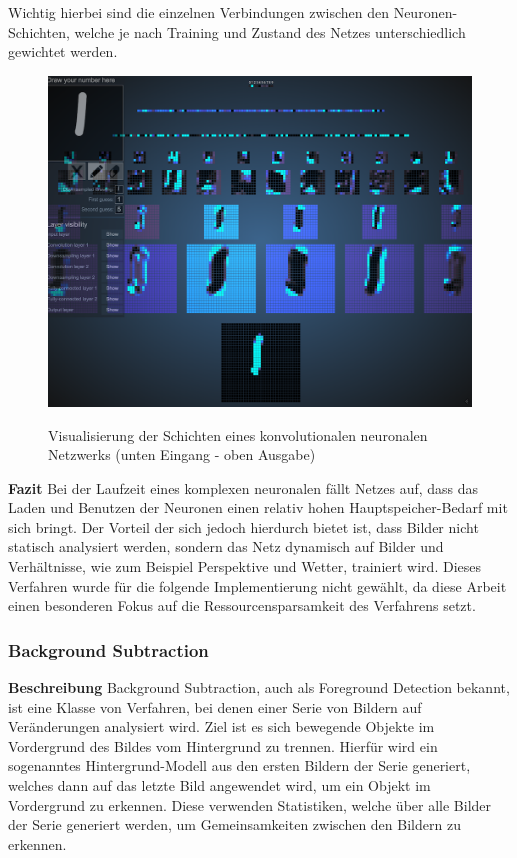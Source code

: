 Wichtig hierbei sind die einzelnen Verbindungen zwischen den Neuronen-Schichten, welche je nach Training und Zustand des Netzes unterschiedlich gewichtet werden.
\begin{figure}[ht]
   \centering
     \includegraphics[width=15cm]{Bilder/cnn-visualized} \\
 \caption{Visualisierung der Schichten eines konvolutionalen neuronalen Netzwerks (unten Eingang - oben Ausgabe)}
 \label{fig:CNN}
\end{figure}
\newline\newline
\textbf{Fazit}\newline
Bei der Laufzeit eines komplexen neuronalen fällt Netzes auf, dass das Laden und Benutzen der Neuronen einen relativ hohen Hauptspeicher-Bedarf mit sich bringt.
Der Vorteil der sich jedoch hierdurch bietet ist, dass Bilder nicht statisch analysiert werden, sondern das Netz dynamisch auf Bilder und Verhältnisse, wie zum Beispiel Perspektive und Wetter, trainiert wird.
Dieses Verfahren wurde für die folgende Implementierung nicht gewählt, da diese Arbeit einen besonderen Fokus auf die Ressourcensparsamkeit des Verfahrens setzt.
\newpage

\subsubsection{Background Subtraction}
\label{sec:backsub-algo}
\textbf{Beschreibung}\newline
Background Subtraction, auch als Foreground Detection bekannt, ist eine Klasse von Verfahren, bei denen einer Serie von Bildern auf Veränderungen analysiert wird.
Ziel ist es sich bewegende Objekte im Vordergrund des Bildes vom Hintergrund zu trennen.
Hierfür wird ein sogenanntes Hintergrund-Modell aus den ersten Bildern der Serie generiert, welches dann auf das letzte Bild angewendet wird, um ein Objekt im Vordergrund zu erkennen. 
Diese verwenden Statistiken, welche über alle Bilder der Serie generiert werden, um Gemeinsamkeiten zwischen den Bildern zu erkennen.

